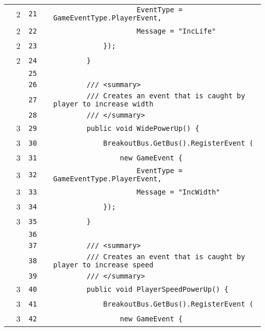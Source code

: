 \documentclass[a4paper,landscape,10pt]{article}
\begin{document}
\begin{longtable}[l]{lrrll}
\cellcolor{green} & 2 & \verb~21~ & & \verb~                    EventType = GameEventType.PlayerEvent,~\\
\cellcolor{green} & 2 & \verb~22~ & & \verb~                    Message = "IncLife"~\\
\cellcolor{green} & 2 & \verb~23~ & & \verb~            });~\\
\cellcolor{green} & 2 & \verb~24~ & & \verb~        }~\\
\cellcolor{gray} &  & \verb~25~ & & \verb~~\\
\cellcolor{gray} &  & \verb~26~ & & \verb~        /// <summary>~\\
\cellcolor{gray} &  & \verb~27~ & & \verb~        /// Creates an event that is caught by player to increase width~\\
\cellcolor{gray} &  & \verb~28~ & & \verb~        /// </summary>~\\
\cellcolor{green} & 3 & \verb~29~ & & \verb~        public void WidePowerUp() {~\\
\cellcolor{green} & 3 & \verb~30~ & & \verb~            BreakoutBus.GetBus().RegisterEvent (~\\
\cellcolor{green} & 3 & \verb~31~ & & \verb~                new GameEvent {~\\
\cellcolor{green} & 3 & \verb~32~ & & \verb~                    EventType = GameEventType.PlayerEvent,~\\
\cellcolor{green} & 3 & \verb~33~ & & \verb~                    Message = "IncWidth"~\\
\cellcolor{green} & 3 & \verb~34~ & & \verb~            });~\\
\cellcolor{green} & 3 & \verb~35~ & & \verb~        }~\\
\cellcolor{gray} &  & \verb~36~ & & \verb~~\\
\cellcolor{gray} &  & \verb~37~ & & \verb~        /// <summary>~\\
\cellcolor{gray} &  & \verb~38~ & & \verb~        /// Creates an event that is caught by player to increase speed~\\
\cellcolor{gray} &  & \verb~39~ & & \verb~        /// </summary>~\\
\cellcolor{green} & 3 & \verb~40~ & & \verb~        public void PlayerSpeedPowerUp() {~\\
\cellcolor{green} & 3 & \verb~41~ & & \verb~            BreakoutBus.GetBus().RegisterEvent (~\\
\cellcolor{green} & 3 & \verb~42~ & & \verb~                new GameEvent {~\\

\end{longtable}
\end{document}
